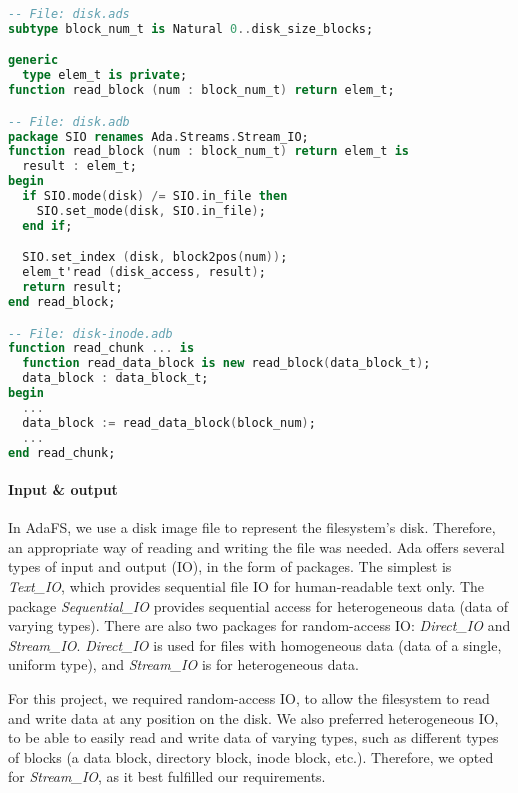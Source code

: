 \begin{lstlisting}[float=tb,caption={Generic function for reading a block of type \textnormal{elem\_t}}, label={code:generic reading function}, language=Ada]
-- File: disk.ads
subtype block_num_t is Natural 0..disk_size_blocks;

generic
  type elem_t is private;
function read_block (num : block_num_t) return elem_t;

-- File: disk.adb
package SIO renames Ada.Streams.Stream_IO;
function read_block (num : block_num_t) return elem_t is
  result : elem_t;
begin
  if SIO.mode(disk) /= SIO.in_file then
    SIO.set_mode(disk, SIO.in_file);
  end if;

  SIO.set_index (disk, block2pos(num));
  elem_t'read (disk_access, result);
  return result;
end read_block;

-- File: disk-inode.adb
function read_chunk ... is
  function read_data_block is new read_block(data_block_t);
  data_block : data_block_t;
begin
  ...
  data_block := read_data_block(block_num);
  ...
end read_chunk;
\end{lstlisting}

\paragraph{Input \& output}
In AdaFS, we use a disk image file to represent the filesystem's disk.
Therefore, an appropriate way of reading and writing the file was needed.
Ada offers several types of input and output (IO), in the form of packages.
The simplest is \textit{Text\_IO}, which provides sequential file IO for human-readable text only.
The package \textit{Sequential\_IO} provides sequential access for heterogeneous data (data of varying types).
There are also two packages for random-access IO: \textit{Direct\_IO} and \textit{Stream\_IO}.
\textit{Direct\_IO} is used for files with homogeneous data (data of a single, uniform type), and \textit{Stream\_IO} is for heterogeneous data.

For this project, we required random-access IO, to allow the filesystem to read and write data at any position on the disk.
We also preferred heterogeneous IO, to be able to easily read and write data of varying types, such as different types of blocks (a data block, directory block, inode block, etc.).
Therefore, we opted for \textit{Stream\_IO}, as it best fulfilled our requirements.

